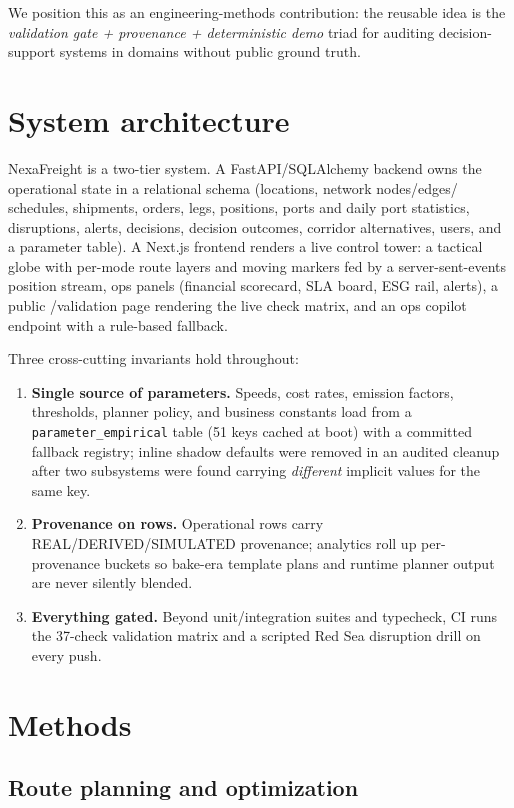 \documentclass[11pt]{article}
\begin{document}
We position this as an engineering-methods contribution: the reusable
idea is the \emph{validation gate + provenance + deterministic demo}
triad for auditing decision-support systems in domains without public
ground truth.

\section{System architecture}

NexaFreight is a two-tier system. A FastAPI/SQLAlchemy backend owns the
operational state in a relational schema (locations, network nodes/edges/
schedules, shipments, orders, legs, positions, ports and daily port
statistics, disruptions, alerts, decisions, decision outcomes,
corridor alternatives, users, and a parameter table). A Next.js frontend
renders a live control tower: a tactical globe with per-mode route layers
and moving markers fed by a server-sent-events position stream, ops
panels (financial scorecard, SLA board, ESG rail, alerts), a public
/validation page rendering the live check matrix, and an ops copilot
endpoint with a rule-based fallback.

Three cross-cutting invariants hold throughout:
\begin{enumerate}
\item \textbf{Single source of parameters.} Speeds, cost rates, emission
factors, thresholds, planner policy, and business constants load from a
\texttt{parameter\_empirical} table (51 keys cached at boot) with a
committed fallback registry; inline shadow defaults were removed in an
audited cleanup after two subsystems were found carrying
\emph{different} implicit values for the same key.
\item \textbf{Provenance on rows.} Operational rows carry
REAL/DERIVED/SIMULATED provenance; analytics roll up per-provenance
buckets so bake-era template plans and runtime planner output are never
silently blended.
\item \textbf{Everything gated.} Beyond unit/integration suites and
typecheck, CI runs the 37-check validation matrix and a scripted Red Sea
disruption drill on every push.
\end{enumerate}

\section{Methods}

\subsection{Route planning and optimization}
\end{document}
